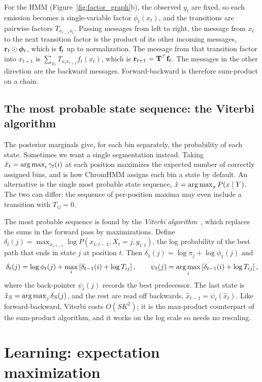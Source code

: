 For the HMM (Figure~\ref{fig:factor_graph}b), the observed $y_t$ are fixed, so each emission becomes a single-variable factor $\phi_t(x_t)$, and the transitions are pairwise factors $T_{x_{t-1}x_t}$. Passing messages from left to right, the message from $x_t$ to the next transition factor is the product of its other incoming messages, $\mathbf{r}_t\odot\boldsymbol{\phi}_t$, which is $\mathbf{f}_t$ up to normalization. The message from that transition factor into $x_{t+1}$ is $\sum_{x_t}T_{x_tx_{t+1}}f_t(x_t)$, which is $\mathbf{r}_{t+1}=\mathbf{T}^\top\mathbf{f}_t$. The messages in the other direction are the backward messages. Forward-backward is therefore sum-product on a chain.

\subsection{The most probable state sequence: the Viterbi algorithm}

The posterior marginals give, for each bin separately, the probability of each state. Sometimes we want a single segmentation instead. Taking $\hat x_t=\operatorname*{arg\,max}_i\gamma_t(i)$ at each position maximizes the expected number of correctly assigned bins, and is how ChromHMM assigns each bin a state by default. An alternative is the single most probable state sequence, $\hat x=\operatorname*{arg\,max}_x P(x\mid Y)$. The two can differ: the sequence of per-position maxima may even include a transition with $T_{ij}=0$.

The most probable sequence is found by the \emph{Viterbi algorithm}~\citep{viterbi1967}, which replaces the sums in the forward pass by maximizations. Define $\delta_t(j)=\max_{x_{1:t-1}}\log P(x_{1:t-1},X_t=j,y_{1:t})$, the log probability of the best path that ends in state $j$ at position $t$. Then $\delta_1(j)=\log\pi_j+\log\phi_1(j)$ and
\begin{equation}
  \delta_t(j) = \log\phi_t(j) + \max_i\left[\delta_{t-1}(i)+\log T_{ij}\right],
  \qquad \psi_t(j) = \operatorname*{arg\,max}_i\left[\delta_{t-1}(i)+\log T_{ij}\right],
\end{equation}
where the back-pointer $\psi_t(j)$ records the best predecessor. The last state is $\hat x_S=\operatorname*{arg\,max}_j\delta_S(j)$, and the rest are read off backwards, $\hat x_{t-1}=\psi_t(\hat x_t)$. Like forward-backward, Viterbi costs $O(SK^2)$; it is the max-product counterpart of the sum-product algorithm, and it works on the log scale so needs no rescaling.

\section{Learning: expectation maximization}
\label{sec:em-06}

